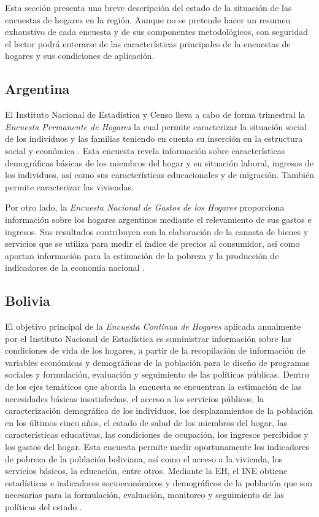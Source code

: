 \documentclass[12pt,spanish,]{book}
\begin{document}
Esta sección presenta una breve descripción del estado de la situación de las encuestas de hogares en la región. Aunque no se pretende hacer un resumen exhaustivo de cada encuesta y de sus componentes metodológicos, con seguridad el lector podrá enterarse de las características principales de la encuestas de hogares y sus condiciones de aplicación.

\hypertarget{argentina}{%
\subsection*{Argentina}\label{argentina}}

El Instituto Nacional de Estadística y Censo lleva a cabo de forma trimestral la \emph{Encuesta Permanente de Hogares} la cual permite caracterizar la situación social de los individuos y las familias teniendo en cuenta su inserción en la estructura social y económica \autocite{INDEC-AR}. Esta encuesta revela información sobre características demográficas básicas de los miembros del hogar y su situación laboral, ingresos de los individuos, así como sus características educacionales y de migración. También permite caracterizar las viviendas.

Por otro lado, la \emph{Encuesta Nacional de Gastos de los Hogares} proporciona información sobre los hogares argentinos mediante el relevamiento de sus gastos e ingresos. Sus resultados contribuyen con la elaboración de la canasta de bienes y servicios que se utiliza para medir el índice de precios al consumidor, así como aportan información para la estimación de la pobreza y la producción de indicadores de la economía nacional \autocite{INDEC-AR2}.

\hypertarget{bolivia}{%
\subsection*{Bolivia}\label{bolivia}}

El objetivo principal de la \emph{Encuesta Continua de Hogares} aplicada anualmente por el Instituto Nacional de Estadística es suministrar información sobre las condiciones de vida de los hogares, a partir de la recopilación de información de variables económicas y demográficas de la población para le diseño de programas sociales y formulación, evaluación y seguimiento de las políticas públicas. Dentro de los ejes temáticos que aborda la encuesta se encuentran la estimación de las necesidades básicas insatisfechas, el acceso a los servicios públicos, la caracterización demográfica de los individuos, los desplazamientos de la población en los últimos cinco años, el estado de salud de los miembros del hogar, las características educativas, las condiciones de ocupación, los ingresos percibidos y los gastos del hogar. Esta encuesta permite medir oportunamente los indicadores de pobreza de la población boliviana, así como el acceso a la vivienda, los servicios básicos, la educación, entre otros. Mediante la EH, el INE obtiene estadísticas e indicadores socioeconómicos y demográficos de la población que son necesarias para la formulación, evaluación, monitoreo y seguimiento de las políticas del estado \autocite{INE-BO}.
\end{document}
